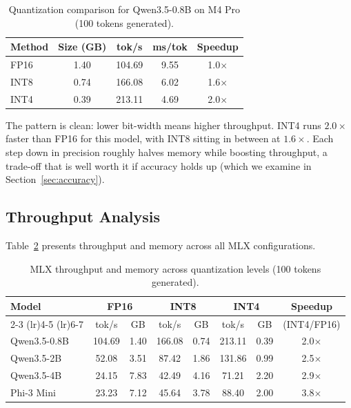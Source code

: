 \documentclass[11pt,a4paper]{article}
\begin{document}
\begin{table}[htbp]
\centering
\caption{Quantization comparison for Qwen3.5-0.8B on M4 Pro (100 tokens generated).}
\label{tab:quant_comparison}
\begin{tabular}{l|cccc}
\toprule
\textbf{Method} & \textbf{Size (GB)} & \textbf{tok/s} & \textbf{ms/tok} & \textbf{Speedup} \\
\midrule
FP16 & 1.40 & 104.69 & 9.55 & 1.0$\times$ \\
INT8 & 0.74 & 166.08 & 6.02 & 1.6$\times$ \\
INT4 & 0.39 & 213.11 & 4.69 & 2.0$\times$ \\
\bottomrule
\end{tabular}
\end{table}

The pattern is clean: lower bit-width means higher throughput. INT4 runs $2.0\times$ faster than FP16 for this model, with INT8 sitting in between at $1.6\times$. Each step down in precision roughly halves memory while boosting throughput, a trade-off that is well worth it if accuracy holds up (which we examine in Section~\ref{sec:accuracy}).

\subsection{Throughput Analysis}

Table~\ref{tab:latency} presents throughput and memory across all MLX configurations.

\begin{table}[htbp]
\centering
\caption{MLX throughput and memory across quantization levels (100 tokens generated).}
\label{tab:latency}
\begin{tabular}{l|ccccccc}
\toprule
\textbf{Model} & \multicolumn{2}{c}{\textbf{FP16}} & \multicolumn{2}{c}{\textbf{INT8}} & \multicolumn{2}{c}{\textbf{INT4}} & \textbf{Speedup} \\
\cmidrule(lr){2-3} \cmidrule(lr){4-5} \cmidrule(lr){6-7}
& tok/s & GB & tok/s & GB & tok/s & GB & (INT4/FP16) \\
\midrule
Qwen3.5-0.8B & 104.69 & 1.40 & 166.08 & 0.74 & 213.11 & 0.39 & 2.0$\times$ \\
Qwen3.5-2B & 52.08 & 3.51 & 87.42 & 1.86 & 131.86 & 0.99 & 2.5$\times$ \\
Qwen3.5-4B & 24.15 & 7.83 & 42.49 & 4.16 & 71.21 & 2.20 & 2.9$\times$ \\
Phi-3 Mini & 23.23 & 7.12 & 45.64 & 3.78 & 88.40 & 2.00 & 3.8$\times$ \\
\bottomrule
\end{tabular}
\end{table}
\end{document}
